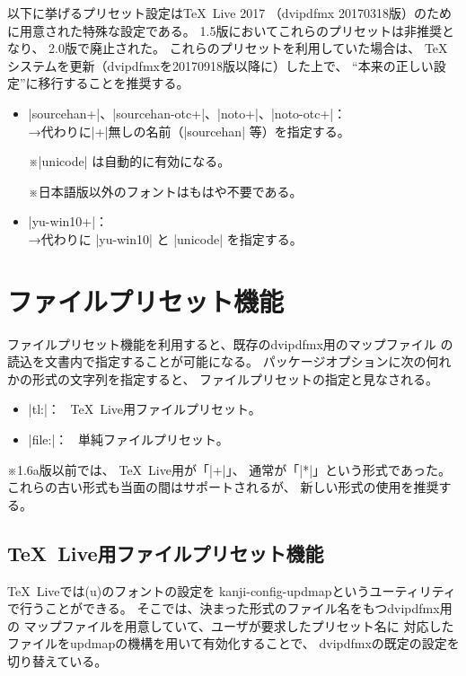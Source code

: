 \documentclass[uplatex,dvipdfmx,a4paper]{jsarticle}
\newcommand{\Note}{\par\noindent ※}
\newcommand{\Means}{：\ }
\newcommand{\Zk}{\mbox{}}
\providecommand{\Strong}[1]{\textsf{#1}}
\begin{document}
以下に挙げるプリセット設定は{\TeX}~Live 2017%
（dvipdfmx 20170318版）のために用意された特殊な設定である。
1.5版においてこれらのプリセットは\Strong{非推奨}となり、
2.0版で廃止された。
これらのプリセットを利用していた場合は、
\Strong{{\TeX}システムを更新}（dvipdfmxを20170918版以降に）した上で、
“本来の正しい設定”に移行することを推奨する。

\begin{itemize}
\item |sourcehan+|、|sourcehan-otc+|、|noto+|、|noto-otc+|：\\
  →代わりに|+|無しの名前（|sourcehan| 等）を指定する。
  \Note |unicode| は自動的に有効になる。
  \Note 日本語版以外のフォントはもはや不要である。

\item |yu-win10+|：\\
  →代わりに |yu-win10| と |unicode| を指定する。
\end{itemize}

\section{ファイルプリセット機能}
\label{sec:FilePreset}

ファイルプリセット機能を利用すると、既存のdvipdfmx用のマップファイル
の読込を文書内で指定することが可能になる。
パッケージオプションに次の何れかの形式の文字列を指定すると、
ファイルプリセットの指定と見なされる。

\begin{itemize}
\item |tl:|\Zk{}\Means
  {\TeX}~Live用ファイルプリセット。
\item |file:|\Zk{}\Means
  単純ファイルプリセット。
\end{itemize}

\Note 1.6a版以前では、
{\TeX}~Live用が「|+|\Zk{}」、
通常が「|*|\Zk{}」という形式であった。
これらの古い形式も当面の間はサポートされるが、
新しい形式の使用を推奨する。

\subsection{{\TeX}~Live用ファイルプリセット機能}

{\TeX}~Liveでは{(u)\pLaTeX}のフォントの設定を
kanji-config-updmapというユーティリティで行うことができる。
そこでは、決まった形式のファイル名をもつdvipdfmx用の
マップファイルを用意していて、ユーザが要求したプリセット名に
対応したファイルをupdmapの機構を用いて有効化することで、
dvipdfmxの既定の設定を切り替えている。
\end{document}
